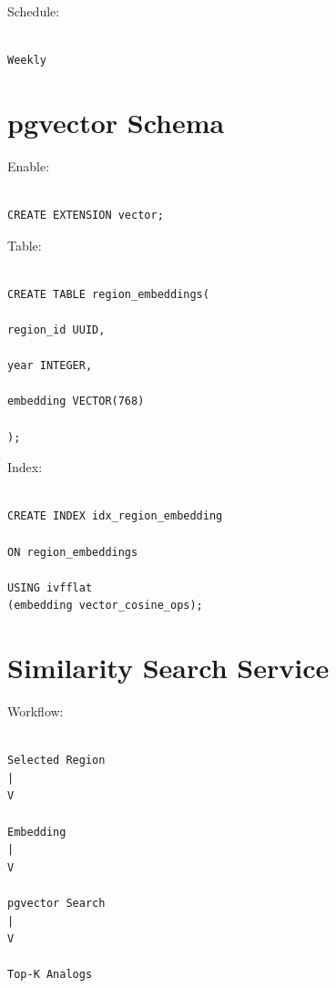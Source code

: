 \documentclass[11pt,a4paper]{article}
\begin{document}
Schedule:

\begin{verbatim}

Weekly

\end{verbatim}

\section{pgvector Schema}

Enable:

\begin{verbatim}

CREATE EXTENSION vector;

\end{verbatim}

Table:

\begin{verbatim}

CREATE TABLE region_embeddings(

region_id UUID,

year INTEGER,

embedding VECTOR(768)

);

\end{verbatim}

Index:

\begin{verbatim}

CREATE INDEX idx_region_embedding

ON region_embeddings

USING ivfflat
(embedding vector_cosine_ops);

\end{verbatim}

\section{Similarity Search Service}

Workflow:

\begin{verbatim}

Selected Region
|
V

Embedding
|
V

pgvector Search
|
V

Top-K Analogs

\end{verbatim}
\end{document}
